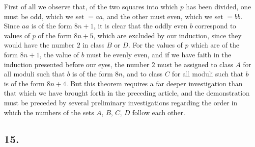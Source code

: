 \documentclass[twoside,12pt]{memoir}
\begin{document}
First of all we observe that, of the two squares into which \(p\) has been divided, one must be odd, which we set \(=a a\), and the other must even, which we set \(=b b\). Since \(a a\) is of the form \(8 n+1\), it is clear that the oddly even \(b\) correspond to values of \(p\) of the form \(8 n+5\), which are excluded by our induction, since they would have the number \(2\) in class \(B\) or \(D\). For the values of \(p\) which are of the form \(8 n+1\), the value of \(b\) must be evenly even, and if we have faith in the induction presented before our eyes, the number \(2\) must be assigned to class \(A\) for all moduli such that \(b\) is of the form \(8 n\), and to class \(C\) for all moduli such that \(b\) is of the form \(8 n+4\). But this theorem requires a far deeper investigation than that which we have brought forth in the preceding article, and the demonstration must be preceded by several preliminary investigations regarding the order in which the numbers of the sets \(A\), \(B\), \(C\), \(D\) follow each other.

\subsection*{15.}
\end{document}
